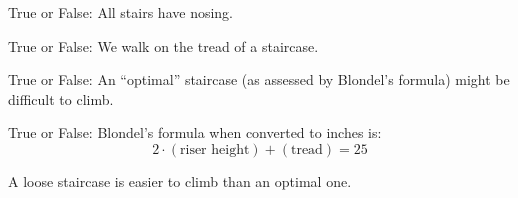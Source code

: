 \documentclass{ximera}
\author{Claire Merriman and Bart Snapp}
\begin{document}
\maketitle



\begin{exercise}
  True or False: All stairs have nosing.
\end{exercise}


\begin{exercise}
   True or False: We walk on the tread of a staircase.
\end{exercise}


\begin{exercise} True or False: 
  An ``optimal'' staircase (as assessed by Blondel's formula) might be difficult to climb.
\end{exercise}

\begin{exercise} True or False: 
  Blondel's formula when converted to inches is:
  \[
  2\cdot (\text{riser height}) + (\text{tread})=25 
  \]
\end{exercise}

\begin{exercise}
  A loose staircase is easier to climb than an optimal one.
\end{exercise}

\end{document}
